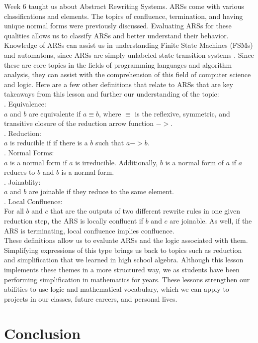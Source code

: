 \documentclass{article}
\theoremstyle{theorem}
\theoremstyle{definition}
\theoremstyle{remark}
\begin{document}
Week 6 taught us about Abstract Rewriting Systems. ARSs come with various classifications and elements. The topics of confluence, termination, and having unique normal forms were previously discussed. Evaluating ARSs for these qualities allows us to classify ARSs and better understand their behavior. Knowledge of ARSs can assist us in understanding Finite State Machines (FSMs) and automatons, since ARSs are simply unlabeled state transition systems \cite{Ars}. Since these are core topics in the fields of programming languages and algorithm analysis, they can assist with the comprehension of this field of computer science and logic. Here are a few other definitions that relate to ARSs that are key takeaways from this lesson and further our understanding of the topic:
\\. Equivalence:
\\\indent $a$ and $b$ are equivalente if $a \equiv b$, where $\equiv$ is the reflexive, symmetric, and transitive closure of the reduction arrow function $->$.
\\. Reduction:
\\\indent $a$ is reducible if if there is a $b$ such that $a -> b$.
\\. Normal Forms:
\\\indent $a$ is a normal form if $a$ is irreducible. Additionally, $b$ is a normal form of $a$ if $a$ reduces to $b$ and $b$ is a normal form. 
\\. Joinablity:
\\\indent $a$ and $b$ are joinable if they reduce to the same element.
\\. Local Confluence:
\\\indent For all $b$ and $c$ that are the outputs of two different rewrite rules in one given reduction step, the ARS is locally confluent if $b$ and $c$ are joinable. As well, if the ARS is terminating, local confluence implies confluence. 
\\\indent These definitions allow us to evaluate ARSs and the logic associated with them. Simplifying expressions of this type brings us back to topics such as reduction and simplification that we learned in high school algebra. Although this lesson implements these themes in a more structured way, we as students have been performing simplification in mathematics for years. These lessons strengthen our abilities to use logic and mathematical vocabulary, which we can apply to projects in our classes, future careers, and personal lives. 
\section{Conclusion}\label{conclusions}
\end{document}
